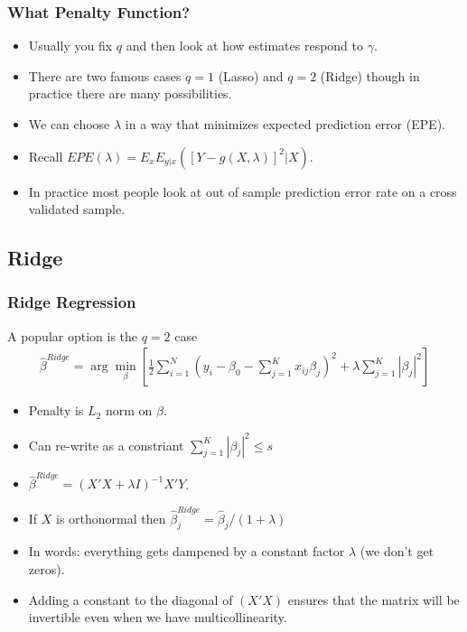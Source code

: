 \begin{frame}
    \frametitle{What Penalty Function?}
    \begin{itemize}
        \item Usually you fix $q$ and then look at how estimates respond to $\gamma$.
        \item There are two famous cases $q=1$ (Lasso) and $q=2$ (Ridge) though in practice there are many possibilities.
        \item We can choose $\lambda$ in a way that minimizes expected prediction error (EPE).
        \item Recall $EPE(\lambda) = E_x E_{y|x} ([ Y- g(X,\lambda)]^2 | X)$.
        \item In practice most people look at out of sample prediction error rate on a \alert{cross validated sample}.
    \end{itemize}
\end{frame}

\subsection{Ridge}

\begin{frame}
    \frametitle{Ridge Regression}
    A popular option is the $q=2$ case
    \begin{eqnarray*}
    \hat{\beta}^{Ridge} = \arg \min_{\beta} \left[\frac{1}{2} \sum_{i=1}^N (y_i - \beta_0 - \sum_{j=1}^K x_{ij} \beta_j)^2 + \lambda \sum_{j=1}^K | \beta_j|^2 \right]
    \end{eqnarray*}
    \begin{itemize}
    \item Penalty is $L_2$ norm on $\beta$.
    \item Can re-write as a constriant  $\sum_{j=1}^K | \beta_j|^2 \leq s$
    \item $\hat{\beta}^{Ridge} = (X'X + \lambda I )^{-1} X' Y$.
    \item If $X$ is orthonormal then $\hat{\beta}_{j}^{Ridge} =  \hat{\beta}_j /(1 +\lambda )$
    \item In words: everything gets dampened by a constant factor $\lambda$ (we don't get zeros).
    \item Adding a constant to the diagonal of $(X'X)$ ensures that the matrix will be invertible even when we have multicollinearity.
    \end{itemize}
\end{frame}

